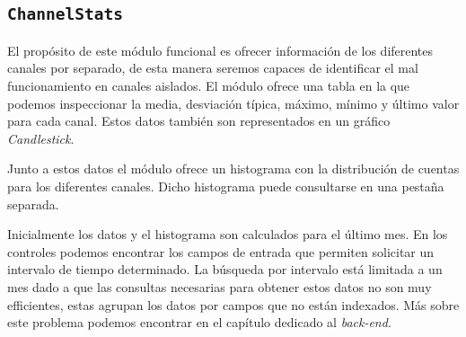 	\subsection{\texttt{ChannelStats}}
		El propósito de este módulo funcional es ofrecer información de los diferentes canales por separado, de esta manera seremos capaces de
		identificar el mal funcionamiento en canales aislados. El módulo ofrece una tabla en la que podemos inspeccionar la media, desviación
		típica, máximo, mínimo y último valor para cada canal. Estos datos también son representados en un gráfico \emph{Candlestick}.
		\par
		Junto a estos datos el módulo ofrece un histograma con la distribución de cuentas para los diferentes canales. Dicho histograma puede
		consultarse en una pestaña separada.
		\par
		Inicialmente los datos y el histograma son calculados para el último mes. En los controles podemos encontrar los campos de entrada que
		permiten solicitar un intervalo de tiempo determinado. La búsqueda por intervalo está limitada a un mes dado a que las consultas
		necesarias para obtener estos datos no son muy efficientes, estas agrupan los datos por campos que no están indexados. Más sobre este
		problema podemos encontrar en el capítulo dedicado al \emph{back-end}.
